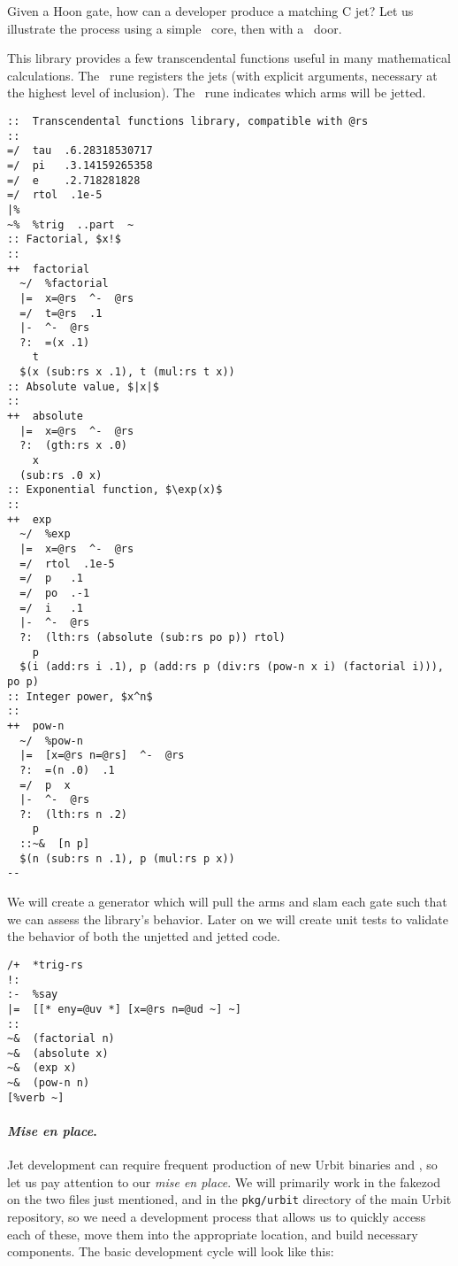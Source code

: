 \begin{example}
Given a Hoon gate, how can a developer produce a matching C jet?  Let us illustrate the process using a simple \barcen~core, then with a \barcab~door.

This library provides a few transcendental functions useful in many mathematical calculations.  The \psigcen~rune registers the jets (with explicit arguments, necessary at the highest level of inclusion).  The \psigfas~rune indicates which arms will be jetted.

\begin{lstlisting}[caption={\texttt{lib/trig-rs.hoon}}]
::  Transcendental functions library, compatible with @rs
::
=/  tau  .6.28318530717
=/  pi   .3.14159265358
=/  e    .2.718281828
=/  rtol  .1e-5
|%
~%  %trig  ..part  ~
:: Factorial, $x!$
::
++  factorial
  ~/  %factorial
  |=  x=@rs  ^-  @rs
  =/  t=@rs  .1
  |-  ^-  @rs
  ?:  =(x .1)
    t
  $(x (sub:rs x .1), t (mul:rs t x))
:: Absolute value, $|x|$
::
++  absolute
  |=  x=@rs  ^-  @rs
  ?:  (gth:rs x .0)
    x
  (sub:rs .0 x)
:: Exponential function, $\exp(x)$
::
++  exp
  ~/  %exp
  |=  x=@rs  ^-  @rs
  =/  rtol  .1e-5
  =/  p   .1
  =/  po  .-1
  =/  i   .1
  |-  ^-  @rs
  ?:  (lth:rs (absolute (sub:rs po p)) rtol)
    p
  $(i (add:rs i .1), p (add:rs p (div:rs (pow-n x i) (factorial i))), po p)
:: Integer power, $x^n$
::
++  pow-n
  ~/  %pow-n
  |=  [x=@rs n=@rs]  ^-  @rs
  ?:  =(n .0)  .1
  =/  p  x
  |-  ^-  @rs
  ?:  (lth:rs n .2)
    p
  ::~&  [n p]
  $(n (sub:rs n .1), p (mul:rs p x))
--
\end{lstlisting}

We will create a generator which will pull the arms and slam each gate such that we can assess the library's behavior.  Later on we will create unit tests to validate the behavior of both the unjetted and jetted code.

\begin{lstlisting}[caption={\texttt{gen/trig.hoon}}]
/+  *trig-rs
!:
:-  %say
|=  [[* eny=@uv *] [x=@rs n=@ud ~] ~]
::
~&  (factorial n)
~&  (absolute x)
~&  (exp x)
~&  (pow-n n)
[%verb ~]
\end{lstlisting}

\paragraph {\emph{Mise en place}.}

Jet development can require frequent production of new Urbit binaries and
, so let us pay attention to our \emph{mise en place}.  We will primarily work in the fakezod on the two files just mentioned, and in the \texttt{pkg/urbit} directory of the main Urbit repository, so we need a development process that allows us to quickly access each of these, move them into the appropriate location, and build necessary components.  The basic development cycle will look like this:


\end{example}
